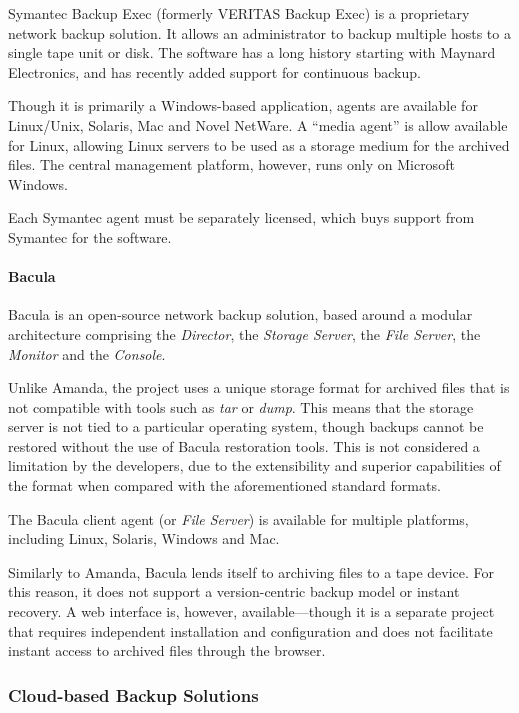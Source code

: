 Symantec Backup Exec (formerly VERITAS Backup Exec) is a proprietary network
backup solution. It allows an administrator to backup multiple hosts to
a single tape unit or disk. The software has a long history starting with
Maynard Electronics, and has recently added support for continuous backup.

Though it is primarily a Windows-based application, agents are available for
Linux/Unix, Solaris, Mac and Novel NetWare. A ``media agent'' is allow
available for Linux, allowing Linux servers to be used as a storage medium for
the archived files. The central management platform, however, runs only on
Microsoft Windows.

Each Symantec agent must be separately licensed, which buys support from
Symantec for the software.

\paragraph{Bacula}

Bacula is an open-source network backup solution, based around a modular
architecture comprising the \emph{Director}, the \emph{Storage Server}, the
\emph{File Server}, the \emph{Monitor} and the \emph{Console}.

Unlike Amanda, the project uses a unique storage format for archived files that
is not compatible with tools such as \emph{tar} or \emph{dump}. This means that
the storage server is not tied to a particular operating system, though backups
cannot be restored without the use of Bacula restoration tools. This is not
considered a limitation by the developers, due to the extensibility and
superior capabilities of the format when compared with the aforementioned
standard formats.

The Bacula client agent (or \emph{File Server}) is available for multiple platforms,
including Linux, Solaris, Windows and Mac.

Similarly to Amanda, Bacula lends itself to archiving files to a tape device.
For this reason, it does not support a version-centric backup model or instant
recovery. A web interface is, however, available---though it is a separate
project that requires independent installation and configuration and does not
facilitate instant access to archived files through the browser.

\subsubsection{Cloud-based Backup Solutions}

